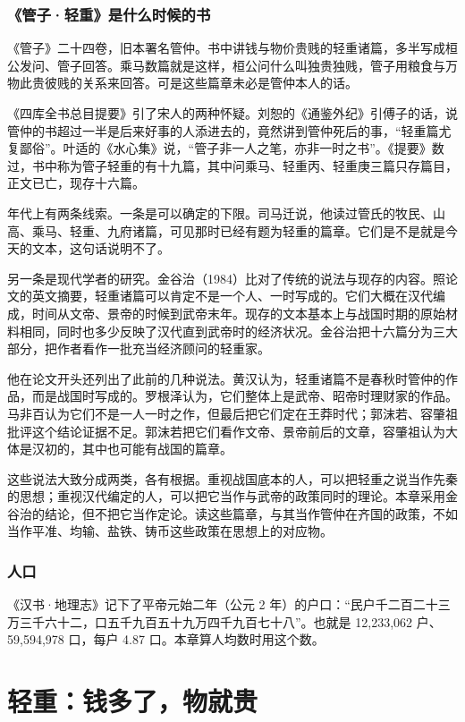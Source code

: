 \subsubsection{《管子·轻重》是什么时候的书}
《管子》二十四卷，旧本署名管仲\cite{guanzi}。书中讲钱与物价贵贱的轻重诸篇，多半写成桓公发问、管子回答。乘马数篇就是这样，桓公问什么叫独贵独贱，管子用粮食与万物此贵彼贱的关系来回答\cite{guanzi}。可是这些篇章未必是管仲本人的话。

《四库全书总目提要》引了宋人的两种怀疑。刘恕的《通鉴外纪》引傅子的话，说管仲的书超过一半是后来好事的人添进去的，竟然讲到管仲死后的事，“轻重篇尤复鄙俗”。叶适的《水心集》说，“管子非一人之笔，亦非一时之书”\cite{guanzi}。《提要》数过，书中称为管子轻重的有十九篇\cite{guanzi}，其中问乘马、轻重丙、轻重庚三篇只存篇目，正文已亡，现存十六篇。

年代上有两条线索。一条是可以确定的下限。司马迁说，他读过管氏的牧民、山高、乘马、轻重、九府诸篇\cite{shiji}，可见那时已经有题为轻重的篇章。它们是不是就是今天的文本，这句话说明不了。

另一条是现代学者的研究。金谷治（1984）比对了传统的说法与现存的内容。照论文的英文摘要，轻重诸篇可以肯定不是一个人、一时写成的。它们大概在汉代编成，时间从文帝、景帝的时候到武帝末年。现存的文本基本上与战国时期的原始材料相同，同时也多少反映了汉代直到武帝时的经济状况\cite{kanaya1984}。金谷治把十六篇分为三大部分，把作者看作一批充当经济顾问的轻重家。

他在论文开头还列出了此前的几种说法。黄汉认为，轻重诸篇不是春秋时管仲的作品，而是战国时写成的。罗根泽认为，它们整体上是武帝、昭帝时理财家的作品。马非百认为它们不是一人一时之作，但最后把它们定在王莽时代；郭沫若、容肇祖批评这个结论证据不足。郭沫若把它们看作文帝、景帝前后的文章，容肇祖认为大体是汉初的，其中也可能有战国的篇章\cite{kanaya1984}。

这些说法大致分成两类，各有根据。重视战国底本的人，可以把轻重之说当作先秦的思想；重视汉代编定的人，可以把它当作与武帝的政策同时的理论。本章采用金谷治的结论，但不把它当作定论。读这些篇章，与其当作管仲在齐国的政策，不如当作平准、均输、盐铁、铸币这些政策在思想上的对应物。

\subsubsection{人口}
《汉书·地理志》记下了平帝元始二年（公元 2 年）的户口：“民户千二百二十三万三千六十二，口五千九百五十九万四千九百七十八”\cite{hanshu}。也就是 12,233,062 户、59,594,978 口，每户 4.87 口。本章算人均数时用这个数。

\section{轻重：钱多了，物就贵}\label{sec:qinhan-qingzhong}

